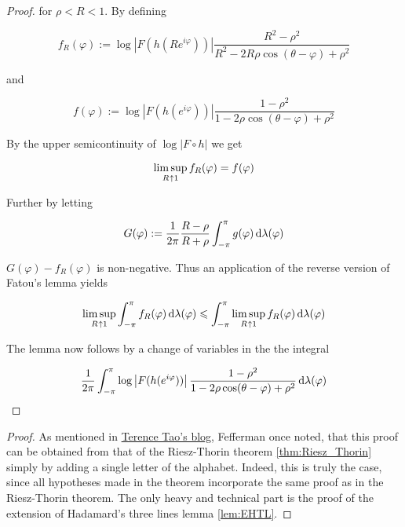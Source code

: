\begin{proof}
\noindent for $\rho < R < 1$. By defining 

\begin{equation*}
	f_R(\varphi) := \log\left| F(h(Re^{i\varphi}))\right| \frac{R^2 - \rho^2}{R^2 - 2R\rho\cos(\theta - \varphi) + \rho^2} 
\end{equation*}

\noindent and 

\begin{equation*}
	f(\varphi) := \log\left| F(h(e^{i\varphi}))\right| \frac{1 - \rho^2}{1 - 2\rho\cos(\theta - \varphi) + \rho^2} 
\end{equation*}

By the upper semicontinuity of $\log|F \circ h|$ we get

\begin{equation*}
	\limsup_{R \toup 1} f_R(\varphi) = f(\varphi)
\end{equation*}

Further by letting 

\begin{equation*}
	 G(\varphi) := \frac{1}{2\pi}\frac{R - \rho}{R + \rho} \int_{-\pi}^\pi g(\varphi) \mathop{}\!\mathrm{d}\lambda(\varphi)
\end{equation*}

\noindent $G(\varphi) - f_R(\varphi)$ is non-negative. Thus an application of the reverse version of Fatou's lemma yields 

\begin{equation*}
	\limsup_{R \toup 1} \int_{-\pi}^\pi f_R(\varphi) \d\lambda(\varphi) \leqslant \int_{-\pi}^\pi \limsup_{R \toup 1} f_R(\varphi)\d\lambda(\varphi)
\end{equation*}

The lemma now follows by a change of variables in the the integral

\begin{equation*}
	\frac{1}{2\pi}\int_{-\pi}^\pi\log\left| F(h(e^{i\varphi}))\right| \frac{1 - \rho^2}{1 - 2\rho\cos(\theta - \varphi) + \rho^2} \mathop{}\!\mathrm{d}\lambda(\varphi)
\end{equation*}
\end{proof}

\begin{proof}
	As mentioned in \href{https://terrytao.wordpress.com/2011/05/03/steins-interpolation-theorem/}{Terence Tao's blog}, Fefferman once noted, that this proof can be obtained from that of the Riesz-Thorin theorem \ref{thm:Riesz_Thorin} simply by adding a single letter of the alphabet. Indeed, this is truly the case, since all hypotheses made in the theorem incorporate the same proof as in the Riesz-Thorin theorem. The only heavy and technical part is the proof of the extension of Hadamard's three lines lemma \ref{lem:EHTL}.
\end{proof}

